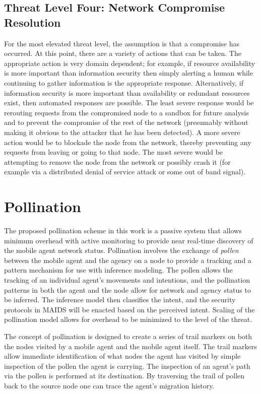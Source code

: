 \documentclass{acm_proc_article-sp}
\begin{document}
\subsection{Threat Level Four: Network Compromise Resolution}
For the most elevated threat level, the assumption is that a compromise has occurred.  At this point, there are a variety of actions that can be taken.  The appropriate action is very domain dependent; for example, if resource availability is more important than information security then simply alerting a human while continuing to gather information is the appropriate response.  Alternatively, if information security is more important than availability or redundant resources exist, then automated responses are possible.  The least severe response would be rerouting requests from the compromised node to a sandbox for future analysis and to prevent the compromise of the rest of the network (presumably without making it obvious to the attacker that he has been detected).  A more severe action would be to blockade the node from the network, thereby preventing any requests from leaving or going to that node.  The most severe would be attempting to remove the node from the network or possibly crash it (for example via a distributed denial of service attack or some out of band signal).

\section{Pollination}
The proposed pollination scheme in this work is a passive system that allows minimum overhead with active monitoring to provide near real-time discovery of the mobile agent network status.  Pollination involves the exchange of {\it pollen} between the mobile agent and the agency on a node to provide a tracking and a pattern mechanism for use with inference modeling.  The pollen allows the tracking of an individual agent's movements and intentions, and the pollination patterns in both the agent and the node allow for network and agency status to be inferred.  The inference model then classifies the intent, and the security protocols in MAIDS will be enacted based on the perceived intent.  Scaling of the pollination model allows for overhead to be minimized to the level of the threat.

The concept of pollination is designed to create a series of trail markers on both the nodes visited by a mobile agent and the mobile agent itself.  The trail markers allow immediate identification of what nodes the agent has visited by simple inspection of the pollen the agent is carrying.  The inspection of an agent's path via the pollen is performed at its destination.  By traversing the trail of pollen back to the source node one can trace the agent's migration history.
\end{document}
